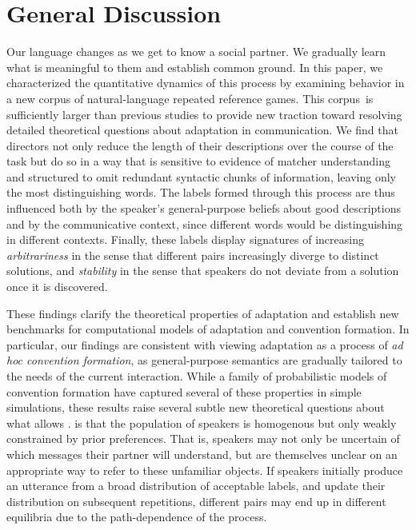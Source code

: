 \documentclass[alpha-refs]{wiley-article}
\begin{document}
\section{General Discussion}
\label{sec:discussion}

Our language changes as we get to know a social partner.
We gradually learn what is meaningful to them and establish common ground.
In this paper, we characterized the quantitative dynamics of this process by examining behavior in a new corpus of natural-language repeated reference games.
This corpus is sufficiently larger than previous studies to provide new traction toward resolving detailed theoretical questions about adaptation in communication.
We find that directors not only reduce the length of their descriptions over the course of the task but do so in a way that is sensitive to evidence of matcher understanding and structured to omit redundant syntactic chunks of information, leaving only the most distinguishing words.
The labels formed through this process are thus influenced both by the speaker's general-purpose beliefs about good descriptions and by the communicative context, since different words would be distinguishing in different contexts. %
Finally, these labels display signatures of increasing \emph{arbitrariness} in the sense that different pairs increasingly diverge to distinct solutions, and \emph{stability} in the sense that speakers do not deviate from a solution once it is discovered.

These findings clarify the theoretical properties of adaptation and establish new benchmarks for computational models of adaptation and convention formation.
In particular, our findings are consistent with viewing adaptation as a process of \emph{ad hoc convention formation}, as general-purpose semantics are gradually tailored to the needs of the current interaction.
While a family of probabilistic models of convention formation \citep{smith_learning_2013,hawkins_convention-formation_2017,Brochagen17} have captured several of these properties in simple simulations, these results raise several subtle new theoretical questions about what allows .
 is that the population of speakers is homogenous but only weakly constrained by prior preferences. 
That is, speakers may not only be uncertain of which messages their partner will understand, but are themselves unclear on an appropriate way to refer to these unfamiliar objects.
If speakers initially produce an utterance from a broad distribution of acceptable labels, and update their distribution on subsequent repetitions, different pairs may end up in different equilibria due to the path-dependence of the process. 
\end{document}
